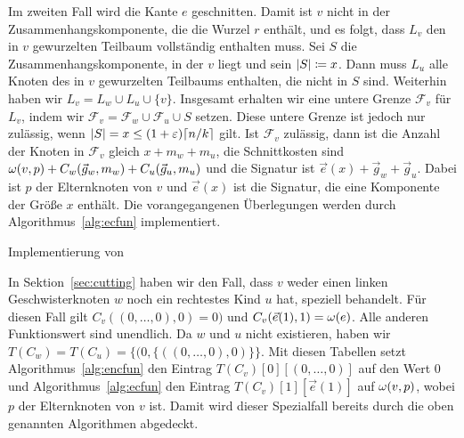 Im zweiten Fall wird die Kante $e$ geschnitten.
 Damit ist $v$ nicht in der Zusammenhangskomponente, die die Wurzel $r$ enthält, und es folgt, dass $L_v$ den in $v$ gewurzelten Teilbaum vollständig enthalten muss. 
Sei $S$ die Zusammenhangskomponente, in der $v$ liegt und sein $\lvert S\rvert \coloneqq x$.
Dann muss $L_u$ alle Knoten des in $v$ gewurzelten Teilbaums enthalten, die nicht in $S$ sind.
Weiterhin haben wir $L_v = L_w \cup L_u \cup \{v\}$. 
Insgesamt erhalten wir eine untere Grenze $\mathcal{F}_v$ für $L_v$, indem wir $\mathcal{F}_v = \mathcal{F}_w \cup \mathcal{F}_u \cup S$ setzen.
Diese untere Grenze ist jedoch nur zulässig, wenn $\lvert S\rvert = x \leq (1+\varepsilon)\lceil n/k\rceil$ gilt.
Ist $\mathcal{F}_v$ zulässig, dann ist die Anzahl der Knoten in $\mathcal{F}_v$ gleich $x + m_w + m_u$, die Schnittkosten sind $\omega(v,p) + C_w(\vec{g}_w, m_w) + C_u(\vec{g}_u, m_u)$ und die Signatur ist $\vec{e}(x) + \vec{g}_w + \vec{g}_u$.
Dabei ist $p$ der Elternknoten von $v$ und $\vec{e}(x)$ ist die Signatur, die eine Komponente der Größe $x$ enthält.
Die vorangegangenen Überlegungen werden durch Algorithmus~\ref{alg:ecfun} implementiert.

\begin{algorithm}
    \caption{Implementierung von }\label{alg:ecfun}
    \begin{algorithmic}[1]
             
                \Return
            \Else
                 
            \EndIf
        \EndFunction
    \end{algorithmic}
\end{algorithm}

\begin{rem}
    In Sektion~\ref{sec:cutting} haben wir den Fall, dass $v$ weder einen linken Geschwisterknoten $w$ noch ein rechtestes Kind $u$ hat, speziell behandelt.
    Für diesen Fall gilt $C_v((0,\ldots,0), 0) = 0)$ und $C_v(\vec{e}(1), 1) = \omega(e)$. 
    Alle anderen Funktionswert sind unendlich.
    Da $w$ und $u$ nicht existieren, haben wir $T(C_w) = T(C_u) = \{(0, \{((0, \ldots, 0), 0)\} \}$.
    Mit diesen Tabellen setzt Algorithmus~\ref{alg:encfun} den Eintrag $T(C_v)[0][(0,\ldots, 0)]$ auf den Wert $0$ und Algorithmus~\ref{alg:ecfun} den Eintrag $T(C_v)[1][\vec{e}(1)]$ auf $\omega(v,p)$, wobei $p$ der Elternknoten von $v$ ist.
    Damit wird dieser Spezialfall bereits durch die oben genannten Algorithmen abgedeckt.
\end{rem}


